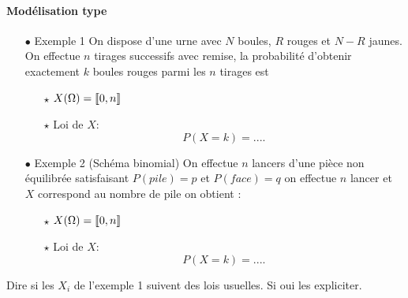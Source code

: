 \documentclass[a4paper, 11pt]{article}
\begin{document}
\paragraph{Mod\'elisation type}
\begin{enumerate}
\item [$\bullet$] Exemple 1 On dispose d'une urne avec $N$ boules, $R$ rouges et $N-R$ jaunes. On effectue $n$ tirages successifs avec remise, la probabilité d'obtenir exactement $k$ boules rouges parmi les $n$ tirages est 

\begin{itemize}
\item[$\star$] $X(\Omega)=\llbracket 0,n\rrbracket$
\item[$\star$] Loi de $X$:
$$P(X=k ) =....$$

\end{itemize}

\item [$\bullet$] Exemple 2 (Sch\'ema binomial) On effectue $n$ lancers d'une pièce non équilibrée satisfaisant $P( pile) =p $ et $P(face)= q$ on effectue $n$ lancer et $X$ correspond au nombre de pile on obtient : 

\begin{itemize}
\item[$\star$] $X(\Omega)=\llbracket 0,n\rrbracket$
\item[$\star$] Loi de $X$:
$$P(X=k ) =....$$

\end{itemize}
\end{enumerate}

\begin{exemple}
    Dire si les $X_i$ de l'exemple 1 suivent des lois usuelles. Si oui les expliciter.
\end{exemple}

\vspace{4cm}
\end{document}
